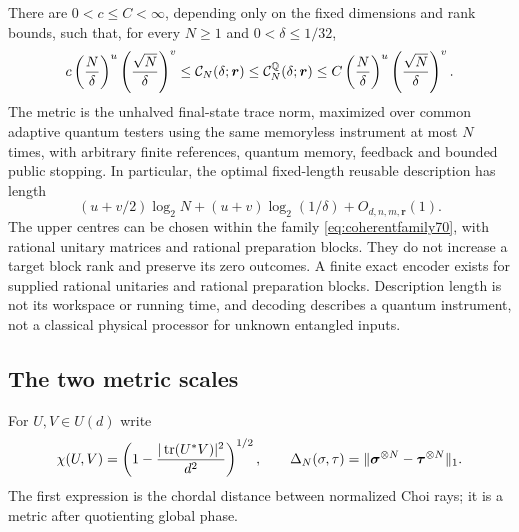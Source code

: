 \begin{theorem}\label{thm:coherententropy70}
There are $0<c\le C<\infty$, depending only on the fixed dimensions and
rank bounds, such that, for every $N\ge1$ and $0<\delta\le1/32$,
\begin{equation}\label{eq:coherententropy70}
 c\left(\frac N\delta\right)^u
  \left(\frac{\sqrt N}\delta\right)^v
 \le\mathcal C_N(\delta;\boldsymbol r)
 \le\mathcal C_N^{\mathbb Q}(\delta;\boldsymbol r)
 \le C\left(\frac N\delta\right)^u
  \left(\frac{\sqrt N}\delta\right)^v.
\end{equation}
The metric is the unhalved final-state trace norm, maximized over common
adaptive quantum testers using the same memoryless instrument at most
$N$ times, with arbitrary finite references, quantum memory, feedback and
bounded public stopping. In particular, the optimal fixed-length reusable
description has length
\begin{equation}\label{eq:coherentbits70}
 (u+v/2)\log_2N+(u+v)\log_2(1/\delta)+O_{d,n,m,\boldsymbol r}(1).
\end{equation}
The upper centres can be chosen within the family
\eqref{eq:coherentfamily70}, with rational unitary matrices and rational
preparation blocks. They do not increase a target block rank and preserve
its zero outcomes. A finite exact encoder exists for supplied rational
unitaries and rational preparation blocks. Description length is not its
workspace or running time, and decoding describes a quantum instrument,
not a classical physical processor for unknown entangled inputs.
\end{theorem}

\subsection{The two metric scales}
For $U,V\in U(d)$ write
\begin{equation}\label{eq:chordunitary70}
 \chi(U,V)=\left(1-\frac{|\operatorname{tr}(U^*V)|^2}{d^2}\right)^{1/2},\qquad
 \Delta_N(\sigma,\tau)=
       \|\boldsymbol\sigma^{\otimes N}-\boldsymbol\tau^{\otimes N}\|_1.
\end{equation}
The first expression is the chordal distance between normalized Choi rays;
it is a metric after quotienting global phase.

